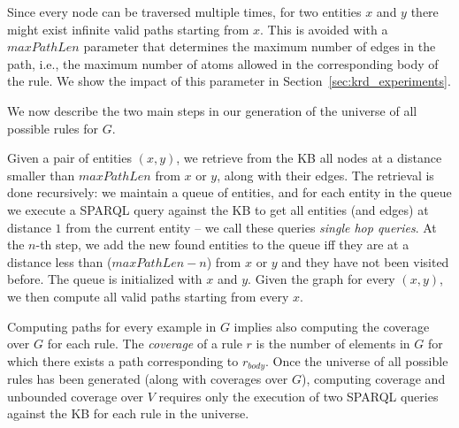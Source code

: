 Since every node can be traversed multiple times, for two entities $x$ and $y$ there might exist infinite valid paths starting from $x$. This is avoided with a $maxPathLen$ parameter that 
determines the maximum number of edges in the path, %
i.e., the maximum number of atoms allowed in the corresponding body of the rule.
We show the impact of this parameter in Section~\ref{sec:krd_experiments}. 

We now describe the two main steps in our generation of the universe of all possible rules for $G$. 

\noindent {}
Given a pair of entities $(x,y)$, we retrieve from the KB all nodes at a distance smaller than $maxPathLen$ from $x$ or $y$, along with their edges. The retrieval is done recursively: we maintain a queue of entities, and for each entity in the queue we execute a SPARQL query against the KB to get all entities (and edges) at distance $1$ from the current entity -- we call these queries \emph{single hop queries}. At the $n$-th step, we add the new found entities to the queue iff they are at a distance less than ($maxPathLen-n$) from $x$ or $y$ and they have not been visited before. The queue is initialized with $x$ and $y$. 
%
Given the graph for every $(x,y)$, we then compute all valid paths starting from every $x$. 

\noindent {}
Computing paths for every example in $G$ implies also computing the coverage over $G$ for each rule. The {\em coverage} of a rule $r$ is the number of elements in $G$ for which there exists a path corresponding to $r_{body}$. 
%
%
Once the universe of all possible rules has been generated (along with coverages over $G$), computing coverage and unbounded coverage over $V$ requires only the execution of two SPARQL queries against the KB for each rule in the universe.

